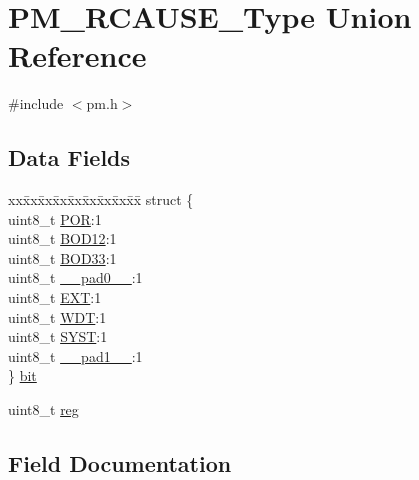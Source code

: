 \hypertarget{union_p_m___r_c_a_u_s_e___type}{}\section{P\+M\+\_\+\+R\+C\+A\+U\+S\+E\+\_\+\+Type Union Reference}
\label{union_p_m___r_c_a_u_s_e___type}


{\ttfamily \#include $<$pm.\+h$>$}

\subsection*{Data Fields}
\begin{DoxyCompactItemize}
\item 
\begin{tabbing}
xx\=xx\=xx\=xx\=xx\=xx\=xx\=xx\=xx\=\kill
struct \{\\
\>uint8\_t \mbox{\hyperlink{union_p_m___r_c_a_u_s_e___type_a81bfdbef9cf92fd56e34762800cf6848}{POR}}:1\\
\>uint8\_t \mbox{\hyperlink{union_p_m___r_c_a_u_s_e___type_aab26fa1476df1c17003c39690dfe1bf4}{BOD12}}:1\\
\>uint8\_t \mbox{\hyperlink{union_p_m___r_c_a_u_s_e___type_a6c07011d4984fb09048023473d657581}{BOD33}}:1\\
\>uint8\_t \mbox{\hyperlink{union_p_m___r_c_a_u_s_e___type_a8b4eebe79ded0459acec2f4950102ba3}{\_\_pad0\_\_}}:1\\
\>uint8\_t \mbox{\hyperlink{union_p_m___r_c_a_u_s_e___type_ab2b0a9353cd632c2007a04cf6c7f365c}{EXT}}:1\\
\>uint8\_t \mbox{\hyperlink{union_p_m___r_c_a_u_s_e___type_a8b4755d38be6cb1d3dec3086dbf93b8d}{WDT}}:1\\
\>uint8\_t \mbox{\hyperlink{union_p_m___r_c_a_u_s_e___type_a394eabd9a76c665e2424898008388739}{SYST}}:1\\
\>uint8\_t \mbox{\hyperlink{union_p_m___r_c_a_u_s_e___type_a77f12d2e278bd5c07712648ac0df5e08}{\_\_pad1\_\_}}:1\\
\} \mbox{\hyperlink{union_p_m___r_c_a_u_s_e___type_a81a5b9dbfbc624984d91867f66f48e57}{bit}}\\

\end{tabbing}\item 
uint8\+\_\+t \mbox{\hyperlink{union_p_m___r_c_a_u_s_e___type_a9428adc9af4653a2050e2536b55dec8d}{reg}}
\end{DoxyCompactItemize}


\subsection{Field Documentation}
\mbox{\label{union_p_m___r_c_a_u_s_e___type_a8b4eebe79ded0459acec2f4950102ba3}} 
